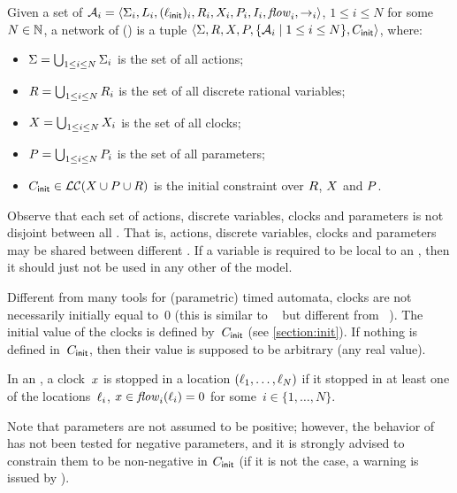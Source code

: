 \begin{definition}[\NIPTA{}]
	Given a set of \IPTA{} $\mathcal{A}_i = \langle\Sigma_i, L_i, (\ell_{\textsf{init}})_i, R_i, X_i, P_i, I_i, \mathit{flow}_i, {\rightarrow}_i\rangle$, $1 \leq i \leq N$ for some $N \in \mathbb N$,
	a network of \IPTA{} (\emph{\NIPTA{}}) is a tuple
	$\langle\Sigma, R, X, P, \{ \mathcal{A}_i \mid 1 \leq i \leq N \}, C_{\textsf{init}}\rangle$, where:
	\begin{itemize}
		\item $\Sigma = \bigcup_{1 \leq i \leq N} \Sigma_i$ is the set of all actions;
		\item $R = \bigcup_{1 \leq i \leq N} R_i$ is the set of all discrete rational variables;
		\item $X = \bigcup_{1 \leq i \leq N} X_i$ is the set of all clocks;
		\item $P = \bigcup_{1 \leq i \leq N} P_i$ is the set of all parameters;
		\item $C_{\textsf{init}} \in \mathcal{LC}(X \cup P \cup R)$ is the initial constraint over $R$, $X$ and $P$. %
	\end{itemize}
\end{definition}

Observe that each set of actions, discrete variables, clocks and parameters is not disjoint between all \IPTA{}.
That is, actions, discrete variables, clocks and parameters may be shared between different \IPTA{}.
If a variable is required to be local to an \IPTA{}, then it should just not be used in any other \IPTA{} of the model.

Different from many tools for (parametric) timed automata, clocks are not necessarily initially equal to~0 (this is similar to \hytech{}~\cite{HHW95} but different from \uppaal{}~\cite{LPY97}).
The initial value of the clocks is defined by~$C_{\textsf{init}}$ (see \cref{section:init}).
If nothing is defined in~$C_{\textsf{init}}$, then their value is supposed to be arbitrary (any real value).


In an \NIPTA{}, a clock~$x$ is stopped in a location $(\ell_1, \dots, \ell_N)$ if it stopped in at least one of the locations~$\ell_i$, \ie{} $x \in \mathit{flow}_i(\ell_i) = 0$ for some~$i \in \{ 1 , \dots , N \}$.

Note that parameters are not assumed to be positive; however, the behavior of \imitator{} has not been tested for negative parameters, and it is strongly advised to constrain them to be non-negative in $C_{\textsf{init}}$ (if it is not the case, a warning is issued by \imitator{}).

